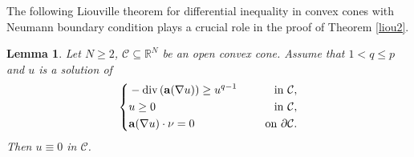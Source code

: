 \documentclass[12pt]{amsart}
\newtheorem{lem}[thm]{Lemma}
\theoremstyle{definition}
\theoremstyle{remark}
\theoremstyle{conclusion}
\theoremstyle{conjecture}
\numberwithin{equation}{section}
\begin{document}
The following Liouville theorem for differential inequality in convex cones with Neumann boundary condition plays a crucial role in the proof of Theorem \ref{liou2}.

\begin{lem}\label{lem2.10}
 Let $N\geq2$, $\mathcal{C}\subseteq\mathbb{R}^{N}$ be an open convex cone. Assume that $1<q\leq p$ and $u$ is a solution of
  \begin{equation*}
    \left\{
        \begin{aligned}
        &-\operatorname{div}\left({\bf{a}}(\nabla u)\right)\geq u^{q-1} \quad\,\,\, &{\rm{in}} \,\, \mathcal{C}, \\
        &u\geq0\quad\,\,\, &{\rm{in}} \,\, \mathcal{C},\\
        &{\bf{a}}(\nabla u)\cdot \nu =0 \quad\,\,\, &{\rm{on}} \,\, \partial\mathcal{C}.
        \end{aligned}
        \right.
  \end{equation*}
Then $u\equiv 0$ in $\mathcal{C}$.
\end{lem}
\end{document}
